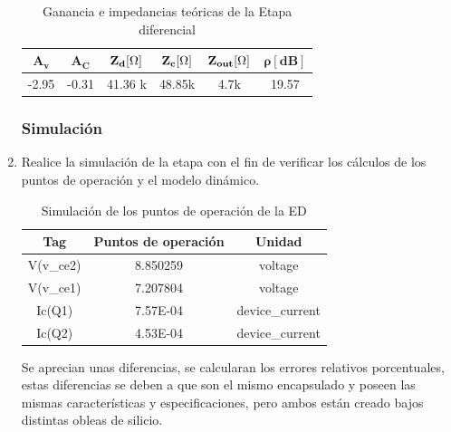 \begin{enumerate}
        \begin{table}[H]
          \centering
          \begin{tabular}{|c|c|c|c|c|c|}
            \hline
            $\mathbf{A_v}$ & $\mathbf{A_C}$ & $\mathbf{Z_{d}[\ohm]}$ & $\mathbf{Z_{c}[\ohm]}$ & $\mathbf{Z_{out} [\ohm]}$ & $\mathbf{\rho [dB]}$ \\ \hline
            -2.95          & -0.31          & 41.36 k                & 48.85k                 & 4.7k                      & 19.57                \\ \hline
          \end{tabular}
          \caption{Ganancia e impedancias teóricas de la Etapa diferencial}
          \label{tab:dinamico_ed}
        \end{table}

        \subsubsection{Simulación}

  \item Realice la simulación de la etapa con el fin de verificar los cálculos de los puntos de operación y el
        modelo dinámico.

        \begin{table}[H]
          \centering
          \begin{tabular}{|c|c|c|}
            \hline
            \textbf{Tag} & \textbf{Puntos de operación} & \textbf{Unidad} \\
            \hline
            V(v\_ce2)    & 8.850259                     & voltage         \\\hline
            V(v\_ce1)    & 7.207804                     & voltage         \\\hline
            Ic(Q1)       & 7.57E-04                     & device\_current \\\hline
            Ic(Q2)       & 4.53E-04                     & device\_current \\
            \hline
          \end{tabular}
          \caption{Simulación de los puntos de operación de la ED}
          \label{tab:ptos_ope_ed}
        \end{table}

        Se aprecian unas diferencias, se calcularan los errores relativos porcentuales, estas diferencias se deben a que son el mismo encapsulado y poseen las mismas características y especificaciones, pero ambos están creado bajos distintas obleas de silicio.


\end{enumerate}

